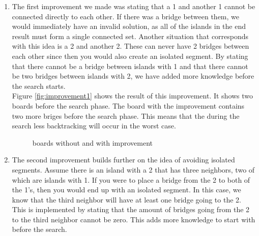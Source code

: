 \documentclass{report}
\begin{document}
\begin{enumerate}
	\item The first improvement we made was stating that a 1 and another 1 cannot be connected directly to each other. If there was a bridge between them, we would immediately have an invalid solution, as all of the islands in the end result must form a single connected set. Another situation that corresponds with this idea is a 2 and another 2. These can never have 2 bridges between each other since then you would also create an isolated segment. By stating that there cannot be a bridge between islands with 1 and that there cannot be two bridges between islands with 2, we have added more knowledge before the search starts. \\
	Figure \ref{fig:improvement1} shows the result of this improvement. It shows two boards before the search phase. The board with the improvement contains two more briges before the search phase. This means that the during the search less backtracking will occur in the worst case.
	\begin{figure}[h]
    	\label{fig:improvement1}
        \centering
        \qquad
        \caption{boards without and with improvement}%
        \label{fig:classic_heuristic}%
    \end{figure}

	\item The second improvement builds further on the idea of avoiding isolated segments.
	Assume there is an island with a 2 that has three neighbors, two of which are islands with 1. If you were to place a bridge from the 2 to both of the 1's, then you would end up with an isolated segment. In this case, we know that the third neighbor will have at least one bridge going to the 2. This is implemented by stating that the amount of bridges going from the 2 to the third neighbor cannot be zero. This adds more knowledge to start with before the search.


\end{enumerate}
\end{document}
